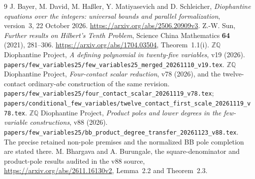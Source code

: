 \documentclass[11pt]{article}
\begin{document}
\begin{thebibliography}{9}
 J. Bayer, M. David, M. Ha{\ss}ler, Y. Matiyasevich and
D. Schleicher, \emph{Diophantine equations over the integers: universal
bounds and parallel formalization}, version~3, 22 October 2026.
\url{https://arxiv.org/abs/2506.20909v3}.
 Z.-W. Sun, \emph{Further results on Hilbert's Tenth Problem},
Science China Mathematics \textbf{64} (2021), 281--306.
\url{https://arxiv.org/abs/1704.03504}, Theorem~1.1(i).
 \(\mathbb Z\mathbb Q\) Diophantine Project,
\emph{A defining polynomial in twenty-five variables}, v19 (2026).
\nolinkurl{papers/few_variables25/few_variables25_merged_20261110_v19.tex}.
 \(\mathbb Z\mathbb Q\) Diophantine Project,
\emph{Four-contact scalar reduction}, v78 (2026), and the twelve-contact
ordinary-$abc$ construction of the same revision.
\nolinkurl{papers/few_variables25/four_contact_scalar_20261119_v78.tex};
\nolinkurl{papers/conditional_few_variables/twelve_contact_first_scale_20261119_v78.tex}.
 \(\mathbb Z\mathbb Q\) Diophantine Project,
\emph{Product poles and lower degrees in the few-variable constructions},
v88 (2026).
\nolinkurl{papers/few_variables25/bb_product_degree_transfer_20261123_v88.tex}.
The precise retained non-pole premises and the normalized BB pole
completion are stated there.
 M. Bhargava and A. Burungale, the square-denominator and
product-pole results audited in the v88 source,
\url{https://arxiv.org/abs/2611.16130v2}, Lemma~2.2 and Theorem~2.3.
\end{thebibliography}
\end{document}
